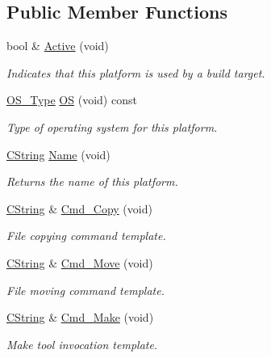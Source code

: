 \subsection*{Public Member Functions}
\begin{DoxyCompactItemize}
\item 
bool \& \hyperlink{classCPlatform_a3504a726ad54051123c9fa0726c51f5b}{Active} (void)
\begin{DoxyCompactList}\small\item\em Indicates that this platform is used by a build target. \end{DoxyCompactList}\item 
\hyperlink{classCPlatform_a2fb735c63c53052f79629e338bb0f535}{O\-S\-\_\-\-Type} \hyperlink{classCPlatform_a376856da6b46b0a8af92abd700afa032}{O\-S} (void) const 
\begin{DoxyCompactList}\small\item\em Type of operating system for this platform. \end{DoxyCompactList}\item 
\hyperlink{classCString}{C\-String} \hyperlink{classCPlatform_a781b6dcd1fcf2adaaebf85058551a0f0}{Name} (void)
\begin{DoxyCompactList}\small\item\em Returns the name of this platform. \end{DoxyCompactList}\item 
\hyperlink{classCString}{C\-String} \& \hyperlink{classCPlatform_a61d3eb5a7d3e3a10d3a7c54bf3ddf79c}{Cmd\-\_\-\-Copy} (void)
\begin{DoxyCompactList}\small\item\em File copying command template. \end{DoxyCompactList}\item 
\hyperlink{classCString}{C\-String} \& \hyperlink{classCPlatform_a1674df6dc1d3874b73c140c7b4ecadad}{Cmd\-\_\-\-Move} (void)
\begin{DoxyCompactList}\small\item\em File moving command template. \end{DoxyCompactList}\item 
\hyperlink{classCString}{C\-String} \& \hyperlink{classCPlatform_a1fe21080da611298e20e3e37a8eebd45}{Cmd\-\_\-\-Make} (void)
\begin{DoxyCompactList}\small\item\em Make tool invocation template. \end{DoxyCompactList}\item 

\end{DoxyCompactItemize}
